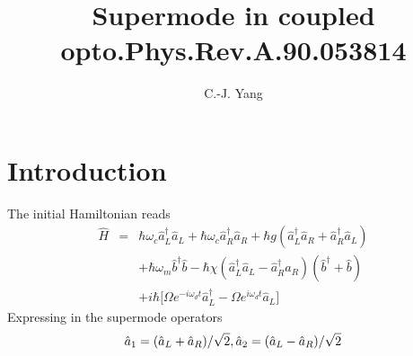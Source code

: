 \documentclass{article}
\begin{document}
\title{Supermode in coupled opto.\footnotesize{Phys.Rev.A.90.053814}}
\author{C.-J. Yang}
\maketitle


\section{Introduction}

The initial Hamiltonian reads%
\begin{eqnarray*}
\hat{H} &=&\hbar \omega _{c}\hat{a}_{L}^{\dag }\hat{a}_{L}+\hbar \omega _{c}%
\hat{a}_{R}^{\dag }\hat{a}_{R}+\hbar g(\hat{a}_{L}^{\dag }\hat{a}_{R}+\hat{a}%
_{R}^{\dag }\hat{a}_{L}) \\
&&+\hbar \omega _{m}\hat{b}^{\dag }\hat{b}-\hbar \chi (\hat{a}_{L}^{\dag }%
\hat{a}_{L}-\hat{a}_{R}^{\dag }\hat{a}_{R})(\hat{b}^{\dag }+\hat{b}) \\
&&+i\hbar \lbrack \Omega e^{-i\omega _{d}t}\hat{a}_{L}^{\dag }-\Omega
e^{i\omega _{d}t}\hat{a}_{L}]
\end{eqnarray*}%
Expressing in the supermode operators%
\begin{equation*}
\hat{a}_{1}=(\hat{a}_{L}+\hat{a}_{R})/\sqrt{2},\hat{a}_{2}=(\hat{a}_{L}-\hat{%
a}_{R})/\sqrt{2}
\end{equation*}
\end{document}
